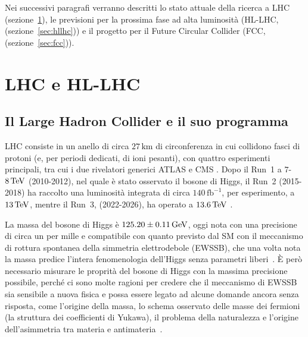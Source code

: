 Nei successivi paragrafi verranno descritti lo stato attuale della ricerca a LHC (sezione~\ref{sec:lhc}), le previsioni per la prossima fase ad alta luminosità (HL-LHC, (sezione~\ref{sec:hllhc})) e il progetto per il Future Circular Collider (FCC, (sezione~\ref{sec:fcc})).


\section{LHC e HL-LHC}
\label{sec:lhc}

\subsection{Il Large Hadron Collider e il suo programma}
LHC consiste in un anello di circa $27\,\mathrm{km}$ di circonferenza in cui collidono fasci di protoni (e, per periodi dedicati, di ioni pesanti), con quattro esperimenti principali, tra cui i due rivelatori generici ATLAS e CMS . Dopo il Run~1 a $7$-$8\,\mathrm{TeV}$ (2010-2012), nel quale è stato osservato il bosone di Higgs, il Run~2 (2015-2018) ha raccolto una luminosità integrata di circa $140\,\mathrm{fb^{-1}}$, per esperimento, a $13\,\mathrm{TeV}$, mentre il Run~3, (2022-2026), ha operato a $13.6\,\mathrm{TeV}$ . 
 
La massa del bosone di Higgs è $125.20\pm0.11\,\mathrm{GeV}$, oggi nota con una precisione di circa un per mille e compatibile con quanto previsto dal SM con il meccanismo di rottura spontanea della simmetria elettrodebole (EWSSB), che una volta nota la massa predice l'intera fenomenologia dell'Higgs senza parametri liberi~\cite{FCC:FSR-v1}. 
È però necessario misurare le proprità del bosone di Higgs con la massima precisione possibile, perché ci sono molte ragioni per credere che il meccanismo di EWSSB sia sensibile a nuova fisica e possa essere legato ad alcune domande ancora senza risposta, come l'origine della massa, lo schema osservato delle masse dei fermioni (la struttura dei coefficienti di Yukawa), il problema della naturalezza e l'origine dell'asimmetria tra materia e antimateria~\cite{FCC:FSR-v1}.
 
